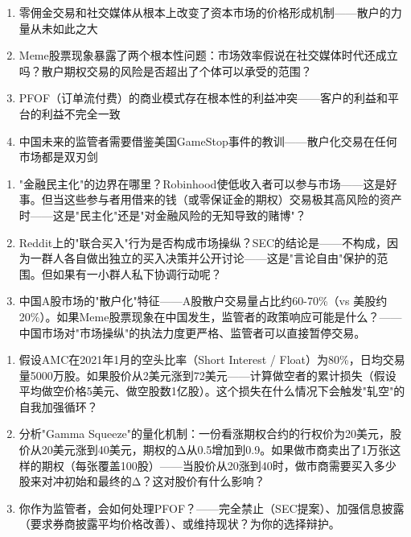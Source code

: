 \documentclass[a4paper,11pt]{ctexbook}
\begin{document}
\begin{lessonsummary}
\begin{enumerate}
  \item 零佣金交易和社交媒体从根本上改变了资本市场的价格形成机制——散户的力量从未如此之大
  \item Meme股票现象暴露了两个根本性问题：市场效率假说在社交媒体时代还成立吗？散户期权交易的风险是否超出了个体可以承受的范围？
  \item PFOF（订单流付费）的商业模式存在根本性的利益冲突——客户的利益和平台的利益不完全一致
  \item 中国未来的监管者需要借鉴美国GameStop事件的教训——散户化交易在任何市场都是双刃剑
\end{enumerate}
\end{lessonsummary}

\begin{discuss}
\begin{enumerate}
  \item "金融民主化"的边界在哪里？Robinhood使低收入者可以参与市场——这是好事。但当这些参与者用借来的钱（或零保证金的期权）交易极其高风险的资产时——这是"民主化"还是"对金融风险的无知导致的赌博"？
  \item Reddit上的"联合买入"行为是否构成市场操纵？SEC的结论是——不构成，因为一群人各自做出独立的买入决策并公开讨论——这是"言论自由"保护的范围。但如果有一小群人私下协调行动呢？
  \item 中国A股市场的"散户化"特征——A股散户交易量占比约60-70\%（vs 美股约20\%）。如果Meme股票现象在中国发生，监管者的政策响应可能是什么？——中国市场对"市场操纵"的执法力度更严格、监管者可以直接暂停交易。
\end{enumerate}
\end{discuss}

\begin{exercises}
\begin{enumerate}
  \item 假设AMC在2021年1月的空头比率（Short Interest / Float）为80\%，日均交易量5000万股。如果股价从2美元涨到72美元——计算做空者的累计损失（假设平均做空价格5美元、做空股数1亿股）。这个损失在什么情况下会触发"轧空"的自我加强循环？
  \item 分析"Gamma Squeeze"的量化机制：一份看涨期权合约的行权价为20美元，股价从20美元涨到40美元，期权的Δ从0.5增加到0.9。如果做市商卖出了1万张这样的期权（每张覆盖100股）——当股价从20涨到40时，做市商需要买入多少股来对冲初始和最终的Δ？这对股价有什么影响？
  \item 你作为监管者，会如何处理PFOF？——完全禁止（SEC提案）、加强信息披露（要求券商披露平均价格改善）、或维持现状？为你的选择辩护。
\end{enumerate}
\end{exercises}
\end{document}
